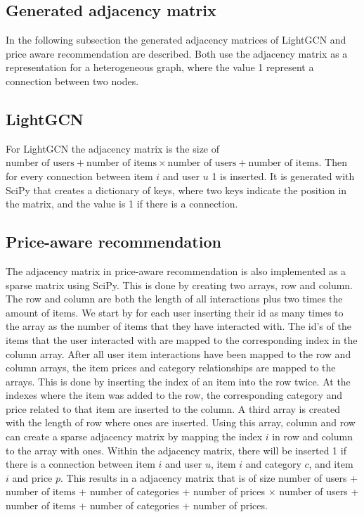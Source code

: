 \subsection{Generated adjacency matrix}
In the following subsection the generated adjacency matrices of LightGCN and price aware recommendation are described.
Both use the adjacency matrix as a representation for a heterogeneous graph, where the value 1 represent a connection between two nodes.

\subsection{LightGCN}
For LightGCN the adjacency matrix is the size of $\textrm{number of users} + \textrm{number of items} \times \textrm{number of users} + \textrm{number of items}$.
Then for every connection between item $i$ and user $u$ 1 is inserted.
It is generated with SciPy that creates a dictionary of keys, where two keys indicate the position in the matrix, and the value is 1 if there is a connection. 

\subsection{Price-aware recommendation}
The adjacency matrix in price-aware recommendation is also implemented as a sparse matrix using SciPy.
This is done by creating two arrays, row and column.
The row and column are both the length of all interactions plus two times the amount of items.
We start by for each user inserting their id as many times to the array as the number of items that they have interacted with.
The id's of the items that the user interacted with are mapped to the corresponding index in the column array.
After all user item interactions have been mapped to the row and column arrays, the item prices and category relationships are mapped to the arrays.
This is done by inserting the index of an item into the row twice.
At the indexes where the item was added to the row, the corresponding category and price related to that item are inserted to the column.
A third array is created with the length of row where ones are inserted.
Using this array, column and row can create a sparse adjacency matrix by mapping the index $i$ in row and column to the array with ones.
Within the adjacency matrix, there will be inserted 1 if there is a connection between item $i$ and user $u$, item $i$ and category $c$, and item $i$ and price $p$.
This results in a adjacency matrix that is of size number of users + number of items + number of categories + number of prices $\times$ number of users + number of items + number of categories + number of prices.
